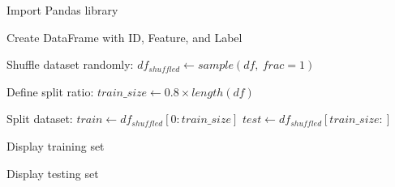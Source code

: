\begin{algorithm}
\caption{Split a DataFrame into Training and Testing Sets using Random Sampling}
\begin{algorithmic}[1]

\STATE Import Pandas library

\STATE Create DataFrame with ID, Feature, and Label

\STATE Shuffle dataset randomly:
\STATE $df_{shuffled} \gets sample(df,\ frac=1)$

\STATE Define split ratio:
\STATE $train\_size \gets 0.8 \times length(df)$

\STATE Split dataset:
\STATE $train \gets df_{shuffled}[0:train\_size]$
\STATE $test \gets df_{shuffled}[train\_size:]$

\STATE Display training set

\STATE Display testing set

\end{algorithmic}
\end{algorithm}